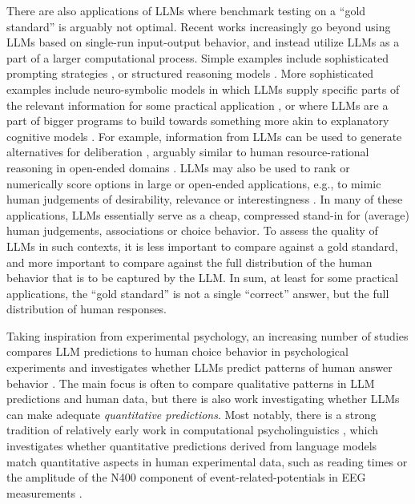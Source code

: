 \documentclass[fleqn]{article}
\begin{document}
There are also applications of LLMs where benchmark testing on a ``gold standard'' is arguably not optimal.
Recent works increasingly go beyond using LLMs based on single-run input-output behavior, and instead utilize LLMs as a part of a larger computational process.
Simple examples include sophisticated prompting strategies \citep[e.g.,][]{LiuLiu2022:Generated-Knowl}, or structured reasoning models \citep[e.g.,][]{CreswellShanahan2022:Selection-Infer,GaoMadaan2023:PAL:-Program-ai,ParanjapeLundberg2023:ART:-Automatic-,YangKlein2023:DOC:-Improving-}.
More sophisticated examples include neuro-symbolic models in which LLMs supply specific parts of the relevant information for some practical application \citep[e.g.,][]{NyeTessler2021:Improving-Coher}, or where LLMs are a part of bigger programs to build towards something more akin to explanatory cognitive models \citep[e.g.,][]{WongGrand2023:From-Word-Model}.
For example, information from LLMs can be used to generate alternatives for deliberation \citep[e.g.][]{LewTessler2020:Leveraging-Unst,TsvilodubCarcassi2024:Towards-Neuro-S}, arguably similar to human resource-rational reasoning in open-ended domains \citep{VulGoodman2014:One-and-Done-Op}.
LLMs may also be used to rank or numerically score options in large or open-ended applications, e.g., to mimic human judgements of desirability, relevance or interestingness \citep[e.g.,][]{BaiKadavath2022:Constitutional-,ParkOBrien2023:Generative-Agen,KwonXie2023:Reward-Design-w,ZhangLehman2023:OMNI:-Open-ende}.
In many of these applications, LLMs essentially serve as a cheap, compressed stand-in for (average) human judgements, associations or choice behavior.
To assess the quality of LLMs in such contexts, it is less important to compare against a gold standard, and more important to compare against the full distribution of the human behavior that is to be captured by the LLM.
In sum, at least for some practical applications, the ``gold standard'' is not a single ``correct'' answer, but the full distribution of human responses.

Taking inspiration from experimental psychology, an increasing number of studies compares LLM predictions to human choice behavior in psychological experiments and investigates whether LLMs predict patterns of human answer behavior  \citep[e.g.,][]{BinzSchulz2023:Using-cognitive,Hagendorff2023:Machine-Psychol,ShiffrinMitchell2023:Probing-the-psy}.
The main focus is often to compare qualitative patterns in LLM predictions and human data, but there is also work investigating whether LLMs can make adequate \emph{quantitative predictions}.
Most notably, there is a strong tradition of relatively early work in computational psycholinguistics \citep{MarvinLinzen2018:Targeted-Syntac,HuGauthier2020:A-Systematic-As}, which investigates whether quantitative predictions derived from language models match quantitative aspects in human experimental data, such as reading times \citep{WilcoxVani2021:A-Targeted-Asse} or the amplitude of the N400 component of event-related-potentials in EEG measurements \citep{LindborgRabovsky2021:Meaning-in-brai}.
\end{document}
